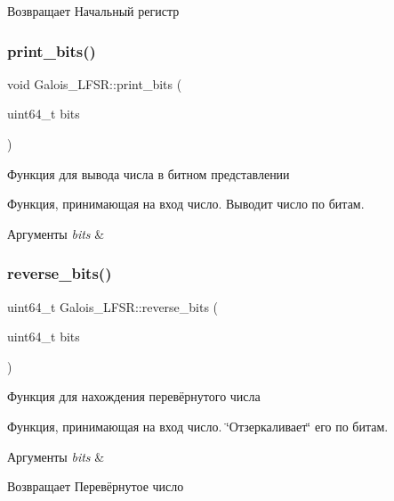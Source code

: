 \begin{DoxyReturn}{Возвращает}
Начальный регистр 
\end{DoxyReturn}
\mbox{\label{classGalois__LFSR_a7a2d2fa3f9f7973cb520d92267f58f4d}} 
\subsubsection{\texorpdfstring{print\+\_\+bits()}{print\_bits()}}
{\footnotesize\ttfamily void Galois\+\_\+\+L\+F\+S\+R\+::print\+\_\+bits (\begin{DoxyParamCaption}\item[{uint64\+\_\+t}]{bits }\end{DoxyParamCaption})}



Функция для вывода числа в битном представлении 

Функция, принимающая на вход число. Выводит число по битам.


\begin{DoxyParams}{Аргументы}
{\em bits} & \\
\hline
\end{DoxyParams}
\mbox{\label{classGalois__LFSR_ae8b9c21348f0f6f75c539e7a8667be88}} 
\subsubsection{\texorpdfstring{reverse\+\_\+bits()}{reverse\_bits()}}
{\footnotesize\ttfamily uint64\+\_\+t Galois\+\_\+\+L\+F\+S\+R\+::reverse\+\_\+bits (\begin{DoxyParamCaption}\item[{uint64\+\_\+t}]{bits }\end{DoxyParamCaption})}



Функция для нахождения перевёрнутого числа 

Функция, принимающая на вход число. \char`\"{}Отзеркаливает\char`\"{} его по битам.


\begin{DoxyParams}{Аргументы}
{\em bits} & \\
\hline
\end{DoxyParams}
\begin{DoxyReturn}{Возвращает}
Перевёрнутое число 
\end{DoxyReturn}

